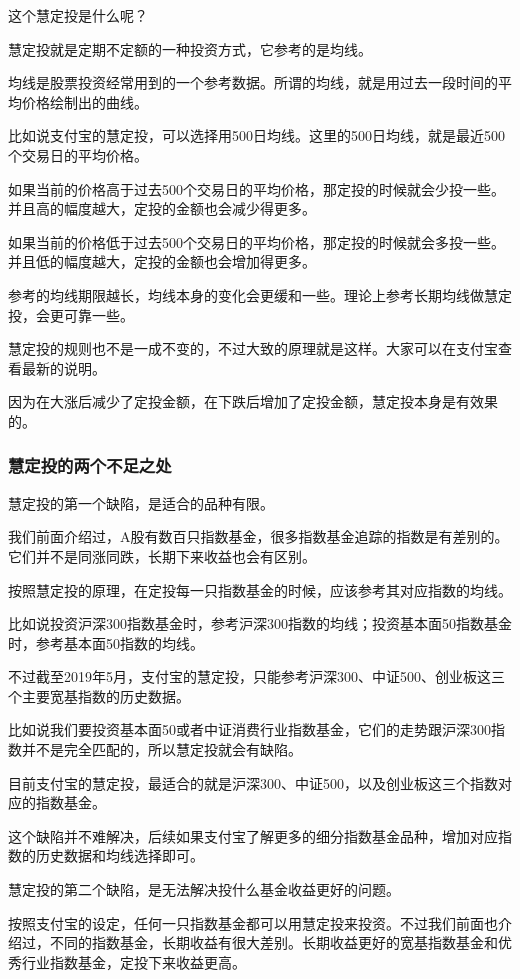 这个慧定投是什么呢？

慧定投就是定期不定额的一种投资方式，它参考的是均线。

均线是股票投资经常用到的一个参考数据。所谓的均线，就是用过去一段时间的平均价格绘制出的曲线。

比如说支付宝的慧定投，可以选择用500日均线。这里的500日均线，就是最近500个交易日的平均价格。

如果当前的价格高于过去500个交易日的平均价格，那定投的时候就会少投一些。并且高的幅度越大，定投的金额也会减少得更多。

如果当前的价格低于过去500个交易日的平均价格，那定投的时候就会多投一些。并且低的幅度越大，定投的金额也会增加得更多。

参考的均线期限越长，均线本身的变化会更缓和一些。理论上参考长期均线做慧定投，会更可靠一些。

慧定投的规则也不是一成不变的，不过大致的原理就是这样。大家可以在支付宝查看最新的说明。

因为在大涨后减少了定投金额，在下跌后增加了定投金额，慧定投本身是有效果的。

\subsubsection{慧定投的两个不足之处}

慧定投的第一个缺陷，是适合的品种有限。

我们前面介绍过，A股有数百只指数基金，很多指数基金追踪的指数是有差别的。它们并不是同涨同跌，长期下来收益也会有区别。

按照慧定投的原理，在定投每一只指数基金的时候，应该参考其对应指数的均线。

比如说投资沪深300指数基金时，参考沪深300指数的均线；投资基本面50指数基金时，参考基本面50指数的均线。

不过截至2019年5月，支付宝的慧定投，只能参考沪深300、中证500、创业板这三个主要宽基指数的历史数据。

比如说我们要投资基本面50或者中证消费行业指数基金，它们的走势跟沪深300指数并不是完全匹配的，所以慧定投就会有缺陷。

目前支付宝的慧定投，最适合的就是沪深300、中证500，以及创业板这三个指数对应的指数基金。

这个缺陷并不难解决，后续如果支付宝了解更多的细分指数基金品种，增加对应指数的历史数据和均线选择即可。

慧定投的第二个缺陷，是无法解决投什么基金收益更好的问题。

按照支付宝的设定，任何一只指数基金都可以用慧定投来投资。不过我们前面也介绍过，不同的指数基金，长期收益有很大差别。长期收益更好的宽基指数基金和优秀行业指数基金，定投下来收益更高。

